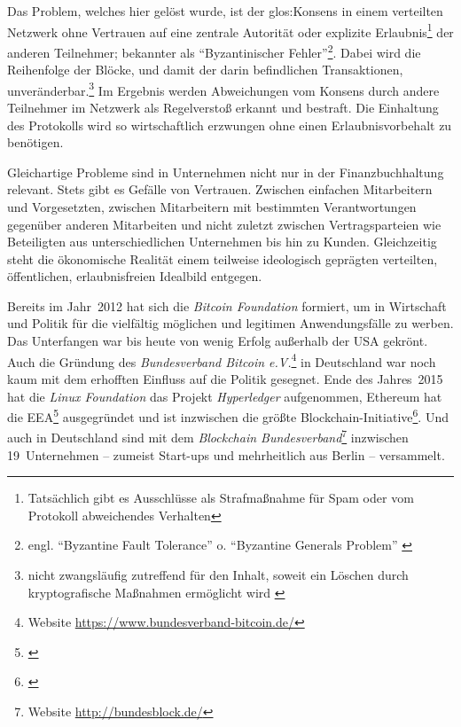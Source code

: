 Das Problem, welches hier gelöst wurde, ist der \gls{glos:Konsens} in einem verteilten Netzwerk ohne Vertrauen auf eine zentrale Autorität oder explizite Erlaubnis\footnote{Tatsächlich gibt es Ausschlüsse als Strafmaßnahme für Spam oder vom Protokoll abweichendes Verhalten} der anderen Teilnehmer; bekannter als \enquote{Byzantinischer Fehler}\footnote{engl. \enquote{Byzantine Fault Tolerance} o. \enquote{Byzantine Generals Problem} \autocite{p:byzantine-original}}.
Dabei wird die Reihenfolge der Blöcke, und damit der darin befindlichen Transaktionen, unveränderbar.\footnote{nicht zwangsläufig zutreffend für den Inhalt, soweit ein Löschen durch kryptografische Maßnahmen ermöglicht wird \autocite{w:accenture-patent}}
Im Ergebnis werden Abweichungen vom Konsens durch andere Teilnehmer im Netzwerk als Regelverstoß erkannt und bestraft.
Die Einhaltung des Protokolls wird so wirtschaftlich erzwungen ohne einen Erlaubnisvorbehalt zu benötigen.


Gleichartige Probleme sind in Unternehmen nicht nur in der Finanzbuchhaltung relevant.
Stets gibt es Gefälle von Vertrauen.
Zwischen
einfachen Mitarbeitern und Vorgesetzten,
zwischen Mitarbeitern mit bestimmten Verantwortungen gegenüber anderen Mitarbeiten
und nicht zuletzt
zwischen Vertragsparteien wie \zB{} Beteiligten aus unterschiedlichen Unternehmen bis hin zu Kunden.
Gleichzeitig steht die ökonomische Realität einem teilweise ideologisch geprägten verteilten, öffentlichen, erlaubnisfreien Idealbild entgegen.


Bereits im Jahr~2012 hat sich die \emph{Bitcoin Foundation} formiert, um in Wirtschaft und Politik für die vielfältig möglichen und legitimen Anwendungsfälle zu werben.
Das Unterfangen war bis heute von wenig Erfolg außerhalb der USA gekrönt.
Auch die Gründung des \emph{Bundesverband Bitcoin e.V.}\footnote{Website \url{https://www.bundesverband-bitcoin.de/}} in Deutschland war noch kaum mit dem erhofften Einfluss auf die Politik gesegnet.
Ende des Jahres~2015 hat die \emph{Linux Foundation} das Projekt \emph{Hyperledger} aufgenommen, Ethereum hat die \gls{EEA}\footnote{%
\cite{p:eea}} ausgegründet und ist inzwischen die größte Blockchain-Initiative\footnote{\cite{w:eea:launch}}.
Und auch in Deutschland sind mit dem \emph{Blockchain Bundesverband}\footnote{Website \url{http://bundesblock.de/}} inzwischen 19~Unternehmen -- zumeist Start-ups und mehrheitlich aus Berlin -- versammelt.

